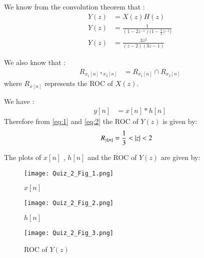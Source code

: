 \documentclass[journal,12pt,twocolumn]{IEEEtran}
\begin{document}
We know from the convolution theorem that :
\begin{align}
Y(z) &= X(z)H(z) \\
Y(z) &= \frac{1}{(1-2z^{-1})({1-\frac{1}{3}z^{-1})}} \\
Y(z) &= \frac{3z^{2}}{(z-2)(3z-1)}
\end{align}

We also know that :
\begin{align}
R_{x_{1}[n]*x_{2}[n]} &= R_{x_1[n]} \cap R_{x_2[n]}
\end{align}
where $R_{x[n]}$ represents the ROC of $X(z)$.

We have :
\begin{align}
y[n] &= x[n]*h[n]
\end{align}
Therefore from \eqref{eq:1} and \eqref{eq:2} the ROC of $Y(z)$ is given by:
\begin{align}
R_{y[n]} &= \frac{1}{3} < \vert z\vert < 2
\end{align}

The plots of $x[n]$ , $h[n]$ and the ROC of $Y(z)$ are given by:
\begin{figure}[!ht]
    \centering
    \texttt{[image: Quiz\_2\_Fig\_1.png]}
    \caption{$x[n]$}
    \label{x[n]}
\end{figure}

\begin{figure}[!ht]
    \centering
    \texttt{[image: Quiz\_2\_Fig\_2.png]}
    \caption{$h[n]$}
    \label{h[n]}
\end{figure}

\begin{figure}[!ht]
    \centering
    \texttt{[image: Quiz\_2\_Fig\_3.png]}
    \caption{ROC of $Y(z)$}
    \label{ROC of Y(z)}
\end{figure}
\end{document}
